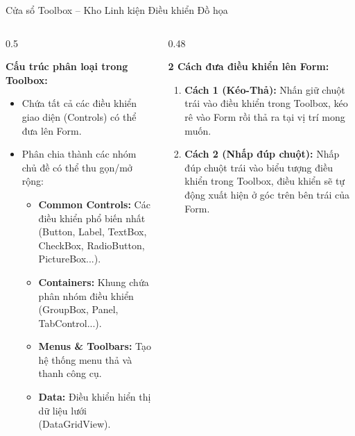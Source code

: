 \documentclass[aspectratio=169, 10pt]{beamer}
\begin{document}
\begin{frame}{Cửa sổ Toolbox -- Kho Linh kiện Điều khiển Đồ họa}
  \begin{columns}[T]
    \begin{column}{0.5\textwidth}
      \begin{block}{\textbf{Cấu trúc phân loại trong Toolbox:}}
        \begin{itemize}\small
          \item Chứa tất cả các điều khiển giao diện (Controls) có thể đưa lên Form.
          \item Phân chia thành các nhóm chủ đề có thể thu gọn/mở rộng:
            \begin{itemize}\footnotesize
              \item \textbf{Common Controls:} Các điều khiển phổ biến nhất (Button, Label, TextBox, CheckBox, RadioButton, PictureBox...).
              \item \textbf{Containers:} Khung chứa phân nhóm điều khiển (GroupBox, Panel, TabControl...).
              \item \textbf{Menus \& Toolbars:} Tạo hệ thống menu thả và thanh công cụ.
              \item \textbf{Data:} Điều khiển hiển thị dữ liệu lưới (DataGridView).
            \end{itemize}
        \end{itemize}
      \end{block}
    \end{column}

    \begin{column}{0.48\textwidth}
      \begin{exampleblock}{\textbf{2 Cách đưa điều khiển lên Form:}}
        \begin{enumerate}\small
          \item \textbf{Cách 1 (Kéo-Thả):} Nhấn giữ chuột trái vào điều khiển trong Toolbox, kéo rê vào Form rồi thả ra tại vị trí mong muốn.
          \item \textbf{Cách 2 (Nhấp đúp chuột):} Nhấp đúp chuột trái vào biểu tượng điều khiển trong Toolbox, điều khiển sẽ tự động xuất hiện ở góc trên bên trái của Form.
        \end{enumerate}
      \end{exampleblock}
    \end{column}
  \end{columns}
\end{frame}
\end{document}
